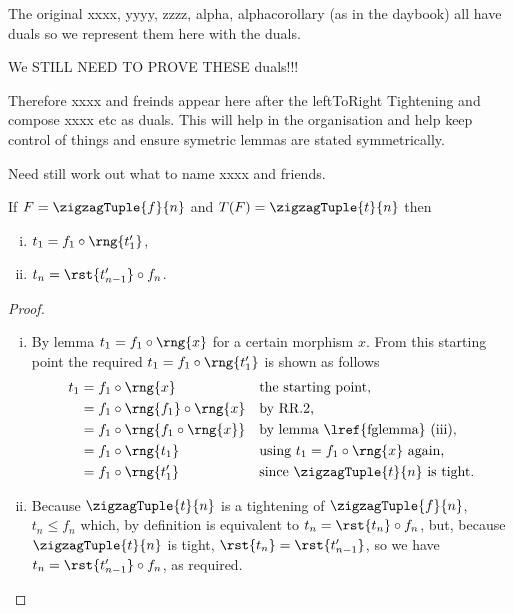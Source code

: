\begin{notebox}
The original xxxx, yyyy, zzzz, alpha, alphacorollary
(as in the daybook) all have duals so we represent them here
with the duals.

We STILL NEED TO PROVE THESE duals!!! 

Therefore  xxxx and freinds appear here after the leftToRight Tightening and compose xxxx etc as duals. This will help in the organisation and help keep control of things and ensure symetric lemmas are stated symmetrically.

Need still work out what to name xxxx and friends. 
\end{notebox}

\begin{lemma}
If $F=\zigzagTuple{f}{n}$ and $T(F)=\zigzagTuple{t}{n}$ then
\begin{enumerate}[(i)]
\item $t_1 = f_1 \circ \rng{t'_1}$,
\item $t_n = \rst{t'_{n-1}} \circ f_n$.
\end{enumerate}
\end{lemma}
\begin{proof}
~ %
\begin{enumerate}[(i)]
\item
By lemma 
$t_1=f_1 \circ \rng{x}$
for a certain morphism $x$.
From this starting point the required 
$t_1 = f_1 \circ \rng{t'_1}$
is shown as follows
\begin{align*}
t_1 &= f_1 \circ \rng{x} 
        &&\mbox{the starting point,} \\
    &= f_1 \circ \rng{f_1} \circ \rng{x}
        && \mbox{by RR.2,}  \\
    &= f_1 \circ \rng{f_1 \circ \rng{x}}
        && \mbox{by lemma \lref{fglemma} (iii),} \\
    &= f_1 \circ \rng{t_1}
        && \mbox{using $t_1=f_1 \circ \rng{x}$ again,} \\
    &= f_1 \circ \rng{t'_1}
        && \mbox{since $\zigzagTuple{t}{n}$ is tight.}
\end{align*}
\item
Because $\zigzagTuple{t}{n}$
is a tightening of $\zigzagTuple{f}{n}$,
$t_n \leq f_n$ which, by definition is equivalent to
$t_n=\rst{t_n} \circ f_n$, but, because 
$\zigzagTuple{t}{n}$ is tight, $\rst{t_n}= \rst{t'_{n-1}}$,
 so we have $t_n=\rst{t'_{n-1}} \circ f_n$, as required.
\end{enumerate}
\end{proof}
